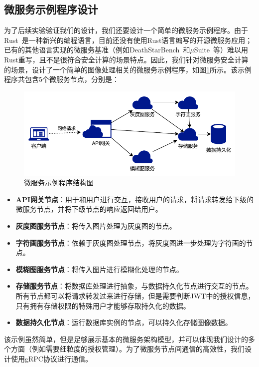 \subsection{微服务示例程序设计}\label{subsec:ms-example}

为了后续实验验证我们的设计，我们还要设计一个简单的微服务示例程序。由于Rust~\cite{rust-lang}是一种新兴的编程语言，目前还没有使用Rust语言编写的开源微服务应用；已有的其他语言实现的微服务基准（例如DeathStarBench~\cite{gan2019open}和$\mu$Suite~\cite{sriraman2018mu}等）难以用Rust重写，且不是很符合安全计算的场景特点。因此，我们针对微服务安全计算的场景，设计了一个简单的图像处理相关的微服务示例程序，如图\ref{fig:ms-demo}所示。该示例程序共包含5个微服务节点，分别是：

\begin{figure}[!ht]
    \centering
    \includegraphics[width=.7\textwidth]{figures/msdemo.pdf}
    \caption{微服务示例程序结构图}
    \label{fig:ms-demo}
\end{figure}

\begin{itemize}
    \item \textbf{API网关节点}：用于和用户进行交互，接收用户的请求，将请求转发给下级的微服务节点，并将下级节点的响应返回给用户。
    \item \textbf{灰度图服务节点}：将传入图片处理为灰度图的节点。
    \item \textbf{字符画服务节点}：依赖于灰度图处理节点，将灰度图进一步处理为字符画的节点。
    \item \textbf{模糊图服务节点}：将传入图片进行模糊化处理的节点。
    \item \textbf{存储服务节点}：将数据库处理进行抽象，与数据持久化节点进行交互的节点。所有节点都可以将请求转发过来进行存储，但是需要判断JWT中的授权信息，只有拥有存储权限的特殊用户才能够存取持久化的数据。%
    \item \textbf{数据持久化节点}：运行数据库实例的节点，可以持久化存储图像数据。%
\end{itemize}

该示例虽然简单，但是足够展示基本的微服务架构模型，并可以体现我们设计的多个方面（例如需要细粒度的授权管理）。为了微服务节点间通信的高效性，我们设计使用gRPC协议进行通信。
